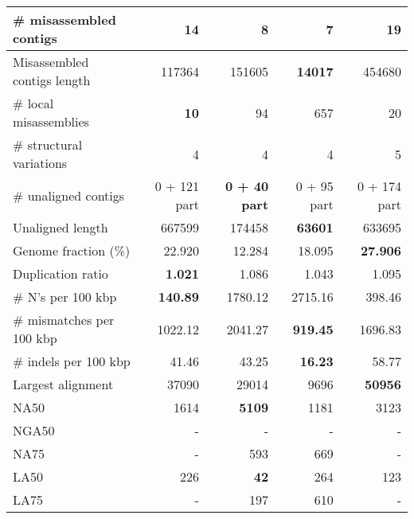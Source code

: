 \documentclass[12pt,a4paper]{article}
\begin{document}
\begin{table}[ht]
\begin{center}
\begin{tabular}{|l*{4}{|r}|}
\# misassembled contigs & 14 & 8 & {\bf 7} & 19 \\ \hline
Misassembled contigs length & 117364 & 151605 & {\bf 14017} & 454680 \\ \hline
\# local misassemblies & {\bf 10} & 94 & 657 & 20 \\ \hline
\# structural variations & 4 & 4 & 4 & 5 \\ \hline
\# unaligned contigs & 0 + 121 part & {\bf 0 + 40 part} & 0 + 95 part & 0 + 174 part \\ \hline
Unaligned length & 667599 & 174458 & {\bf 63601} & 633695 \\ \hline
Genome fraction (\%) & 22.920 & 12.284 & 18.095 & {\bf 27.906} \\ \hline
Duplication ratio & {\bf 1.021} & 1.086 & 1.043 & 1.095 \\ \hline
\# N's per 100 kbp & {\bf 140.89} & 1780.12 & 2715.16 & 398.46 \\ \hline
\# mismatches per 100 kbp & 1022.12 & 2041.27 & {\bf 919.45} & 1696.83 \\ \hline
\# indels per 100 kbp & 41.46 & 43.25 & {\bf 16.23} & 58.77 \\ \hline
Largest alignment & 37090 & 29014 & 9696 & {\bf 50956} \\ \hline
NA50 & 1614 & {\bf 5109} & 1181 & 3123 \\ \hline
NGA50 & - & - & - & - \\ \hline
NA75 & - & 593 & 669 & - \\ \hline
LA50 & 226 & {\bf 42} & 264 & 123 \\ \hline
LA75 & - & 197 & 610 & - \\ \hline
\end{tabular}
\end{center}
\end{table}
\end{document}
